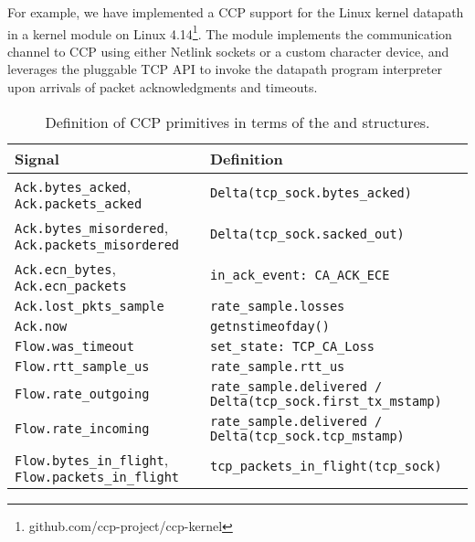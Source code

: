 For example, we have implemented a CCP support for the Linux kernel datapath in a kernel
module on Linux 4.14\footnote{github.com/ccp-project/ccp-kernel}. The module
implements the communication channel to CCP using either Netlink sockets or a custom
character device, and leverages the pluggable TCP API to invoke the datapath program
interpreter upon arrivals of packet acknowledgments and timeouts.
%
\begin{table}
    \centering
    \footnotesize
    \begin{tabular}{p{}p{}}
        \textbf{Signal} & \textbf{Definition} \\
        \hline
        \texttt{Ack.bytes\_acked}, \texttt{Ack.packets\_acked}             & \texttt{Delta(tcp\_sock.bytes\_acked)} \\
        \texttt{Ack.bytes\_misordered}, \texttt{Ack.packets\_misordered}   & \texttt{Delta(tcp\_sock.sacked\_out)} \\
        \texttt{Ack.ecn\_bytes}, \texttt{Ack.ecn\_packets}                 & \texttt{in\_ack\_event: CA\_ACK\_ECE} \\
        \texttt{Ack.lost\_pkts\_sample}                                    & \texttt{rate\_sample.losses} \\
        \texttt{Ack.now}                                                   & \texttt{getnstimeofday()}\\
        \texttt{Flow.was\_timeout}                                         & \texttt{set\_state: TCP\_CA\_Loss} \\
        \texttt{Flow.rtt\_sample\_us}                                      & \texttt{rate\_sample.rtt\_us} \\
        \texttt{Flow.rate\_outgoing}                                       & \texttt{rate\_sample.delivered / Delta(tcp\_sock.first\_tx\_mstamp)} \\
        \texttt{Flow.rate\_incoming}                                       & \texttt{rate\_sample.delivered / Delta(tcp\_sock.tcp\_mstamp)}  \\
        \texttt{Flow.bytes\_in\_flight}, \texttt{Flow.packets\_in\_flight} & \texttt{tcp\_packets\_in\_flight(tcp\_sock)} \\
    \end{tabular}
    \caption{Definition of CCP primitives in terms of the  and  structures.}\label{tab:api:kernel}
\end{table}

